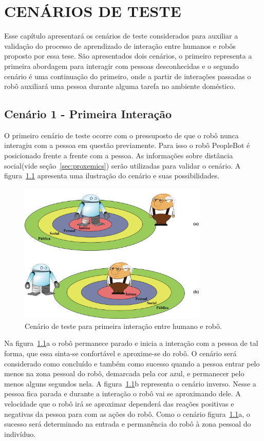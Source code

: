 \chapter{CENÁRIOS DE TESTE}
\label{cap:testes}
Esse capítulo apresentará os cenários de teste considerados para auxiliar a validação do processo de aprendizado de interação entre humanos e robôs proposto por essa tese. São apresentados dois cenários, o primeiro representa a primeira abordagem para interagir com pessoas desconhecidas e o segundo cenário é uma continuação do primeiro, onde a partir de interações passadas o robô auxiliará uma pessoa durante alguma tarefa no ambiente doméstico.

\section{Cenário 1 - Primeira Interação}
\label{sec:cenario1}
O primeiro cenário de teste ocorre com o pressuposto de que o robô nunca interagiu com a pessoa em questão previamente. Para isso o robô PeopleBot é posicionado frente a frente com a pessoa. As informações sobre distância social(vide seção~\ref{sec:proxemics}) serão utilizadas para validar o cenário. A figura~\ref{fig:cenario1} apresenta uma ilustração do cenário e suas possibilidades.

\begin{figure}[ht!]
	\centering
	\includegraphics[width=0.8\textwidth]{images/cenario01.png}
	\caption{Cenário de teste para primeira interação entre humano e robô.}
	\label{fig:cenario1}
\end{figure}

Na figura~\ref{fig:cenario1}a o robô permanece parado e inicia a interação com a pessoa de tal forma, que essa sinta-se confortável e aproxime-se do robô. O cenário será considerado como concluído e também como sucesso quando a pessoa entrar pelo menos na zona pessoal do robô, demarcada pela cor azul, e permanecer pelo menos alguns segundos nela. A figura~\ref{fig:cenario1}b representa o cenário inverso. Nesse a pessoa fica parada e durante a interação o robô vai se aproximando dele. A velocidade que o robô irá se aproximar dependerá das reações positivas e negativas da pessoa para com as ações do robô. Como o cenário figura~\ref{fig:cenario1}a, o sucesso será determinado na entrada e permanência do robô à zona pessoal do indivíduo.

